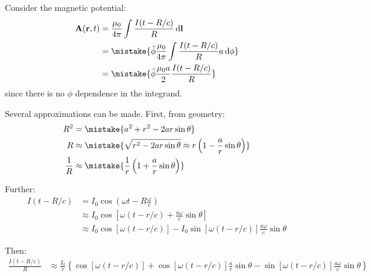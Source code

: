 \documentclass[12pt]{article}
\begin{document}



\pagebreak
\section*{}



Consider the magnetic potential:
\begin{equation}
    \begin{split}
        \mathbf{A}(\mathbf{r}, t) &= \frac{\mu_{0}}{4\pi} \int \frac{I(t - R/c)}{R} \, \mathrm{d}\mathbf{l} \\
        &= \mistake{\hat{\phi} \frac{\mu_{0}}{4\pi} \int \frac{I(t - R/c)}{R} a \, \mathrm{d}\phi} \\
        &= \mistake{\hat{\phi} \frac{\mu_{0} a}{2} \frac{I(t - R/c)}{R}}
    \end{split}
\end{equation}
since there is no $\phi$ dependence in the integrand.

Several approximations can be made. First, from geometry:
\begin{equation}
    \begin{split}
        R^{2} &= \mistake{a^{2} + r^{2} - 2ar \sin{\theta}} \\
        R &\approx \mistake{\sqrt{r^{2} - 2ar \sin{\theta}} \approx r \left( 1 - \frac{a}{r} \sin{\theta} \right)} \\
        \frac{1}{R} &\approx \mistake{\frac{1}{r} \left( 1 + \frac{a}{r} \sin{\theta} \right)}
    \end{split}
\end{equation}

Further:
\begin{equation}
    \begin{split}
        I(t - R/c) &= I_{0} \cos{\left( \omega t - R \frac{\omega}{c} \right)} \\
        &\approx I_{0} \cos{\left[ \omega (t - r/c) + \frac{a\omega}{c} \sin{\theta} \right]} \\
        &\approx I_{0} \cos{\left[ \omega (t - r/c) \right]} - I_{0} \sin{\left[ \omega (t - r/c) \right]} \frac{a \omega}{c} \sin{\theta}
    \end{split}
\end{equation}

Then:
\begin{equation}
    \begin{split}
        \frac{I(t - R/c)}{R} &\approx \frac{I_{0}}{r} \left\{ \cos{\left[ \omega (t - r/c) \right]} + \cos{\left[ \omega (t - r/c) \right]} \frac{a}{r} \sin{\theta} - \sin{\left[ \omega (t - r/c) \right]} \frac{a \omega}{c} \sin{\theta} \right\} \\
    \end{split}
\end{equation}
\end{document}
